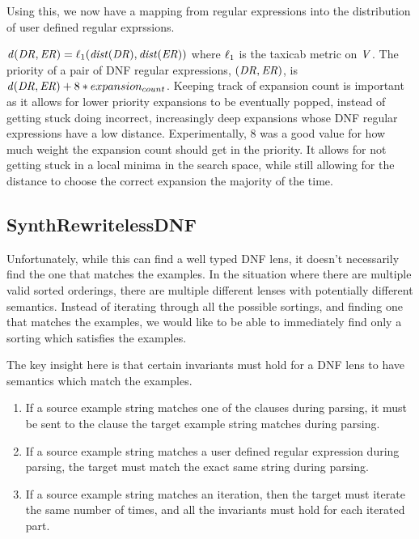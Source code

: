 \documentclass[numbers]{sigplanconf}
\begin{document}
Using this, we now have a mapping from regular expressions into the distribution
of user defined regular exprssions.

$\mathit{d}(\mathit{DR},\mathit{ER})=\ell_1(\mathit{dist}(\mathit{DR}),\mathit{dist}(\mathit{ER}))$
where $\ell_1$ is the taxicab metric on $\mathit{V}{}$.
The priority of a pair of DNF regular expressions, $(\mathit{DR}{},\mathit{ER}{})$,
is $\mathit{d}(\mathit{DR}{},\mathit{ER}{})+8*expansion_{count}$.
Keeping track of expansion count is important as it allows for lower priority
expansions to be eventually popped, instead of getting stuck doing incorrect,
increasingly deep expansions whose DNF regular expressions have a low distance.
Experimentally, 8 was a good value for how much weight the expansion
count should get in the priority.  It allows for not getting stuck in a local
minima in the search space, while still allowing for the distance to choose the
correct expansion the majority of the time.

\subsection{SynthRewritelessDNF}
Unfortunately, while this can find a well typed DNF lens, it doesn't
necessarily find the one that matches the examples.  In the situation where
there are multiple valid sorted orderings, there are multiple different lenses
with potentially different semantics.  Instead of iterating through all the
possible sortings, and finding one that matches the examples, we would like to
be able to immediately find only a sorting which satisfies the examples.

The key insight here is that certain invariants must hold for a DNF lens to have
semantics which match the examples.

\begin{enumerate}
\item If a source example string matches one of the clauses during parsing,
  it must be sent to the clause the target example string matches during parsing.
\item If a source example string matches a user defined regular expression during
  parsing, the target must match the exact same string during parsing.
\item If a source example string matches an iteration, then the target must iterate
  the same number of times, and all the invariants must hold for each iterated part.
\end{enumerate}
\end{document}
